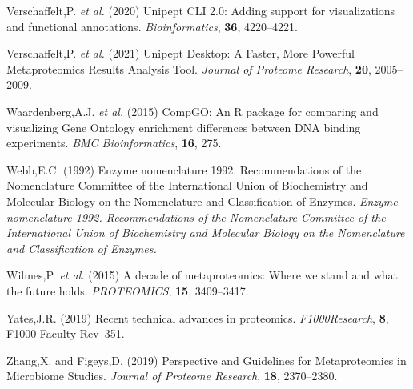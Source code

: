 \begin{CSLReferences}{1}{0}
\leavevmode\hypertarget{ref-verschaffeltUnipeptCLIAdding2020}{}%
Verschaffelt,P. \emph{et al.} (2020) Unipept {CLI} 2.0: Adding support
for visualizations and functional annotations. \emph{Bioinformatics},
\textbf{36}, 4220--4221.

\leavevmode\hypertarget{ref-verschaffeltUnipeptDesktopFaster2021}{}%
Verschaffelt,P. \emph{et al.} (2021) Unipept {Desktop}: {A Faster},
{More Powerful Metaproteomics Results Analysis Tool}. \emph{Journal of
Proteome Research}, \textbf{20}, 2005--2009.

\leavevmode\hypertarget{ref-waardenbergCompGOPackageComparing2015}{}%
Waardenberg,A.J. \emph{et al.} (2015) {CompGO}: An {R} package for
comparing and visualizing {Gene Ontology} enrichment differences between
{DNA} binding experiments. \emph{BMC Bioinformatics}, \textbf{16}, 275.

\leavevmode\hypertarget{ref-webbEnzymeNomenclature19921992}{}%
Webb,E.C. (1992) Enzyme nomenclature 1992. {Recommendations} of the
{Nomenclature Committee} of the {International Union} of {Biochemistry}
and {Molecular Biology} on the {Nomenclature} and {Classification} of
{Enzymes}. \emph{Enzyme nomenclature 1992. Recommendations of the
Nomenclature Committee of the International Union of Biochemistry and
Molecular Biology on the Nomenclature and Classification of Enzymes.}

\leavevmode\hypertarget{ref-wilmesDecadeMetaproteomicsWhere2015}{}%
Wilmes,P. \emph{et al.} (2015) A decade of metaproteomics: {Where} we
stand and what the future holds. \emph{PROTEOMICS}, \textbf{15},
3409--3417.

\leavevmode\hypertarget{ref-yatesRecentTechnicalAdvances2019}{}%
Yates,J.R. (2019) Recent technical advances in proteomics.
\emph{F1000Research}, \textbf{8}, F1000 Faculty Rev--351.

\leavevmode\hypertarget{ref-zhangPerspectiveGuidelinesMetaproteomics2019}{}%
Zhang,X. and Figeys,D. (2019) Perspective and {Guidelines} for
{Metaproteomics} in {Microbiome Studies}. \emph{Journal of Proteome
Research}, \textbf{18}, 2370--2380.

\end{CSLReferences}

